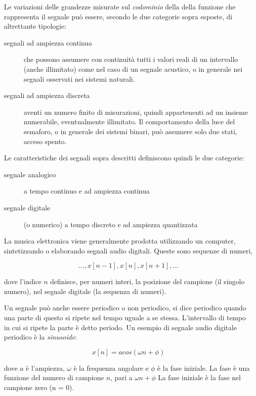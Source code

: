 Le variazioni delle grandezze misurate sul \emph{codominio} della della funzione
che rappresenta il segnale può essere, secondo le due categorie sopra esposte, di
altrettante tipologie:

\begin{description}
  \item[segnali ad ampiezza continua] che possono assumere con continuità tutti
  i valori reali di un intervallo (anche illimitato) come nel caso di un segnale
  acustico, o in generale nei segnali osservati nei sistemi naturali.
  \item[segnali ad ampiezza discreta] aventi un numero finito di misurazioni,
  quindi appartenenti ad un insieme numerabile, eventualmente illimitato.
  Il comportamento della luce del semaforo, o in generale dei sistemi binari, può
  assumere solo due stati, acceso spento.
\end{description}

Le caratteristiche dei segnali sopra descritti definiscono quindi le due categorie:

\begin{description}
  \item[segnale analogico] a tempo continuo e ad ampiezza continua
  \item[segnale digitale] (o numerico) a tempo discreto e ad ampiezza quantizzata
\end{description}

La musica elettronica viene generalmente prodotta utilizzando un computer,
sintetizzando o elaborando segnali audio digitali. Queste sono sequenze di numeri,

\begin{equation}
  \label{digsig}
  ...,x[n-1],x[n],x[n+1],...
\end{equation}

dove l'indice $n$ definisce, per numeri interi, la posizione del campione (il singolo numero),
nel segnale digitale (la sequenza di numeri).

Un segnale può anche essere periodico o non periodico, si dice periodico quando
una parte di questo si ripete nel tempo uguale a se stessa. L'intervallo di tempo
in cui si ripete la parte è detto periodo. Un esempio di segnale audio digitale
periodico è la \emph{sinusoide}:

\begin{equation}
  \label{digsin}
x[n] = a cos(\omega n + \phi)
\end{equation}

dove $a$ è l'ampiezza, $\omega$ è la frequenza angolare e $\phi$ è la fase
iniziale. La fase è una funzione del numero di campione $n$, pari a $\omega n + \phi$
La fase iniziale è la fase nel campione zero (n = 0).

